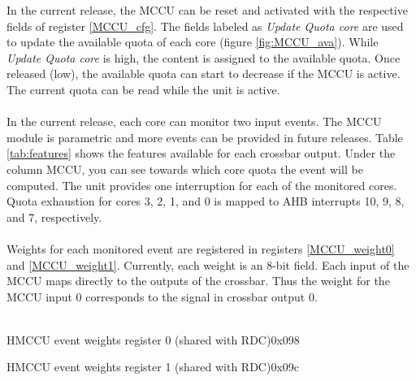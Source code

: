 In the current release, the MCCU can be reset and activated with the respective fields of register \ref{MCCU_cfg}. The fields labeled as \textit{Update Quota core} are used to update the available quota of each core (figure \ref{fig:MCCU_ava}). While  \textit{Update Quota core} is high, the content is assigned to the available quota. Once released (low), the available quota can start to decrease if the MCCU is active. The current quota can be read while the unit is active.\\
\\
In the current release, each core can monitor two input events. The MCCU module is parametric and more events can be provided in future releases.  Table \ref{tab:features} shows the features available for each crossbar output. Under the column MCCU, you can see towards which core quota the event will be computed.
The unit provides one interruption for each of the monitored cores. Quota exhaustion for cores 3, 2, 1, and 0 is mapped to AHB interrupts 10, 9, 8, and 7, respectively.\\
\\
Weights for each monitored event are registered in registers \ref{MCCU_weight0} and \ref{MCCU_weight1}. Currently, each weight is an 8-bit field. Each input of the MCCU maps directly to the outputs of the crossbar. Thus the weight for the MCCU input 0 corresponds to the signal in crossbar output 0.\\
\\
\begin{register}{H}{MCCU event weights register 0 (shared with RDC)}{0x098}
	\label{MCCU_weight0}
	\regnewline
\end{register}
\begin{register}{H}{MCCU event weights register 1 (shared with RDC)}{0x09c}
	\label{MCCU_weight1}
	\regnewline
\end{register}

